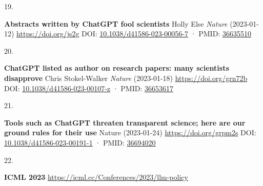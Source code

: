 \documentclass[
]{article}
\newlength{\cslhangindent}
\newlength{\csllabelwidth}
\newlength{\cslentryspacingunit} %
\newenvironment{CSLReferences}[2] %
 {%
  \setlength{\parindent}{0pt}
  \ifodd #1
  \let\oldpar\par
  \def\par{\hangindent=\cslhangindent\oldpar}
  \fi
  \setlength{\parskip}{#2\cslentryspacingunit}
 }%
 {}
\newcommand{\CSLBlock}[1]{#1\hfill\break}
\newcommand{\CSLLeftMargin}[1]{\parbox[t]{\csllabelwidth}{#1}}
\newcommand{\CSLRightInline}[1]{\parbox[t]{\linewidth - \csllabelwidth}{#1}\break}
\providecommand{\DIFdeltex}[1]{{\protect\color{red}\sout{#1}}}                      %
\providecommand{\DIFaddbegin}{} %
\providecommand{\DIFaddend}{} %
\providecommand{\DIFdelbegin}{} %
\providecommand{\DIFdelend}{} %
\providecommand{\DIFdel}[1]{\texorpdfstring{\DIFdeltex{#1}}{}} %
\newcommand{\DIFscaledelfig}{0.5}
\newlength{\DIFdelgraphicswidth} %
\newlength{\DIFdelgraphicsheight} %
\newcommand{\DIFaddincludegraphics}[2][]{{\color{blue}\fbox{\DIFOincludegraphics[#1]{#2}}}} %
\newcommand{\DIFdelincludegraphics}[2][]{%
\sbox{\DIFdelgraphicsbox}{\DIFOincludegraphics[#1]{#2}}%
\settoboxwidth{\DIFdelgraphicswidth}{\DIFdelgraphicsbox} %
\settoboxtotalheight{\DIFdelgraphicsheight}{\DIFdelgraphicsbox} %
\scalebox{\DIFscaledelfig}{%
\parbox[b]{\DIFdelgraphicswidth}{\usebox{\DIFdelgraphicsbox}\\[-\baselineskip] \rule{\DIFdelgraphicswidth}{0em}}\llap{\resizebox{\DIFdelgraphicswidth}{\DIFdelgraphicsheight}{%
\setlength{\unitlength}{\DIFdelgraphicswidth}%
\begin{picture}(1,1)%
\thicklines\linethickness{2pt} %
{\color[rgb]{1,0,0}\put(0,0){\framebox(1,1){}}}%
{\color[rgb]{1,0,0}\put(0,0){\line( 1,1){1}}}%
{\color[rgb]{1,0,0}\put(0,1){\line(1,-1){1}}}%
\end{picture}%
}\hspace*{3pt}}} %
} %
\DeclareRobustCommand{\DIFaddbegin}{\DIFOaddbegin \let\includegraphics\DIFaddincludegraphics} %
\DeclareRobustCommand{\DIFaddend}{\DIFOaddend \let\includegraphics\DIFOincludegraphics} %
\DeclareRobustCommand{\DIFdelbegin}{\DIFOdelbegin \let\includegraphics\DIFdelincludegraphics} %
\DeclareRobustCommand{\DIFdelend}{\DIFOaddend \let\includegraphics\DIFOincludegraphics} %
\begin{document}
\begin{CSLReferences}{0}{0}
\leavevmode\vadjust pre{\DIFdelbegin %

\DIFdel{pre}%
\DIFdelend \hypertarget{ref-1EAonKBXJ}{}}%
\DIFdelbegin %
\DIFdelend \DIFaddbegin \CSLLeftMargin{19. }\DIFaddend %
\CSLRightInline{\textbf{Abstracts written by ChatGPT fool scientists}
\CSLBlock{Holly Else} \emph{Nature} (2023-01-12) \url{https://doi.org/js2g}
\CSLBlock{DOI: \href{https://doi.org/10.1038/d41586-023-00056-7}{10.1038/d41586-023-00056-7} · PMID: \href{https://www.ncbi.nlm.nih.gov/pubmed/36635510}{36635510}}}

\leavevmode{}%
\DIFdelbegin %
\DIFdelend \DIFaddbegin \CSLLeftMargin{20. }\DIFaddend %
\CSLRightInline{\textbf{ChatGPT listed as author on research papers: many scientists disapprove}
\CSLBlock{Chris Stokel-Walker} \emph{Nature} (2023-01-18) \url{https://doi.org/grn72b}
\CSLBlock{DOI: \href{https://doi.org/10.1038/d41586-023-00107-z}{10.1038/d41586-023-00107-z} · PMID: \href{https://www.ncbi.nlm.nih.gov/pubmed/36653617}{36653617}}}

\leavevmode{}%
\DIFdelbegin %
\DIFdelend \DIFaddbegin \CSLLeftMargin{21. }\DIFaddend %
\CSLRightInline{\textbf{Tools such as ChatGPT threaten transparent science; here are our ground rules for their use}
\CSLBlock{Nature} (2023-01-24) \url{https://doi.org/grpm2s}
\CSLBlock{DOI: \href{https://doi.org/10.1038/d41586-023-00191-1}{10.1038/d41586-023-00191-1} · PMID: \href{https://www.ncbi.nlm.nih.gov/pubmed/36694020}{36694020}}}

\leavevmode{}%
\DIFdelbegin %
\DIFdelend \DIFaddbegin \CSLLeftMargin{22. }\DIFaddend %
\CSLRightInline{\textbf{ICML 2023} \url{https://icml.cc/Conferences/2023/llm-policy}}

\end{CSLReferences}
\DIFaddbegin 

\clearpage
\setcounter{page}{1}
\end{document}

